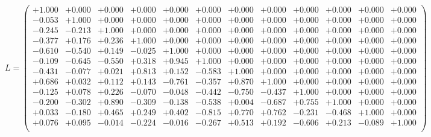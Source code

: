 \documentclass[9pt]{article}
\theoremstyle{plain}
\theoremstyle{definition}
\theoremstyle{remark}
\numberwithin{equation}{section}
\begin{document}
$L = \left(
\begin{array}{
cccccccccccc}
+1.000 & +0.000 & +0.000 & +0.000 & +0.000 & +0.000 & +0.000 & +0.000 & +0.000 & +0.000 & +0.000 & +0.000 \\
-0.053 & +1.000 & +0.000 & +0.000 & +0.000 & +0.000 & +0.000 & +0.000 & +0.000 & +0.000 & +0.000 & +0.000 \\
-0.245 & -0.213 & +1.000 & +0.000 & +0.000 & +0.000 & +0.000 & +0.000 & +0.000 & +0.000 & +0.000 & +0.000 \\
-0.377 & +0.176 & +0.236 & +1.000 & +0.000 & +0.000 & +0.000 & +0.000 & +0.000 & +0.000 & +0.000 & +0.000 \\
-0.610 & -0.540 & +0.149 & -0.025 & +1.000 & +0.000 & +0.000 & +0.000 & +0.000 & +0.000 & +0.000 & +0.000 \\
-0.109 & -0.645 & -0.550 & +0.318 & +0.945 & +1.000 & +0.000 & +0.000 & +0.000 & +0.000 & +0.000 & +0.000 \\
-0.431 & -0.077 & +0.021 & +0.813 & +0.152 & -0.583 & +1.000 & +0.000 & +0.000 & +0.000 & +0.000 & +0.000 \\
+0.686 & +0.032 & +0.112 & +0.143 & -0.761 & -0.357 & +0.870 & +1.000 & +0.000 & +0.000 & +0.000 & +0.000 \\
-0.125 & +0.078 & +0.226 & -0.070 & -0.048 & -0.442 & -0.750 & -0.437 & +1.000 & +0.000 & +0.000 & +0.000 \\
-0.200 & -0.302 & +0.890 & -0.309 & -0.138 & -0.538 & +0.004 & -0.687 & +0.755 & +1.000 & +0.000 & +0.000 \\
+0.033 & -0.180 & +0.465 & +0.249 & +0.402 & -0.815 & +0.770 & +0.762 & -0.231 & -0.468 & +1.000 & +0.000 \\
+0.076 & +0.095 & -0.014 & -0.224 & -0.016 & -0.267 & +0.513 & +0.192 & -0.606 & +0.213 & -0.089 & +1.000 \\
\end{array}
\right)$ \newline 
\end{document}
